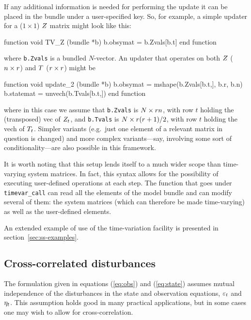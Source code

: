 If any additional information is needed for performing the update it
can be placed in the bundle under a user-specified key.  So, for
example, a simple updater for a ($1 \times 1$) $Z$ matrix might
look like this:
%
\begin{code}
function void TV_Z (bundle *b)
    b.obsymat = b.Zvals[b.t]
end function
\end{code}
%
where \texttt{b.Zvals} is a bundled $N$-vector. An updater that
operates on both $Z$ ($n \times r$) and $T$
($r \times r$) might be
%
\begin{code}
function void update_2 (bundle *b)
    b.obsymat = mshape(b.Zvals[b.t,], b.r, b.n)
    b.statemat = unvech(b.Tvals[b.t,])
end function
\end{code}
%
where in this case we assume that \texttt{b.Zvals} is
$N \times rn$, with row $t$ holding the (transposed) vec of
$Z_t$, and \texttt{b.Tvals} is $N \times r(r +1)/2$,
with row $t$ holding the vech of $T_t$. Simpler variants
(e.g.\ just one element of a relevant matrix in question is changed)
and more complex variants---say, involving some sort of
conditionality---are also possible in this framework.

It is worth noting that this setup lends itself to a much wider scope
than time-varying system matrices. In fact, this syntax allows for the
possibility of executing user-defined operations at each step. The
function that goes under \texttt{timevar\_call} can read all the
elements of the model bundle and can modify several of them: the
system matrices (which can therefore be made time-varying) as well as
the user-defined elements.

An extended example of use of the time-variation facility is presented
in section~\ref{sec:ss-examples}.

\subsection{Cross-correlated disturbances}
\label{sec:crossd}

The formulation given in equations (\ref{eq:obs}) and (\ref{eq:state})
assumes mutual independence of the disturbances in the state and
observation equations, $\varepsilon_t$ and $\eta_t$.  This assumption
holds good in many practical applications, but in some cases one may
wish to allow for cross-correlation.

